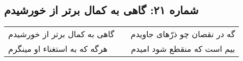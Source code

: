 \begin{center}
\section*{شماره ۲۱: گاهی به کمال برتر از خورشیدم}
\label{sec:021}
\begin{longtable}{l p{0.5cm} r}
گاهی به کمال برتر از خورشیدم
&&
گه در نقصان چو ذرّهای جاویدم
\\
هرگه که به استغناء او مینگرم
&&
بیم است که منقطع شود امیدم
\\
\end{longtable}
\end{center}
